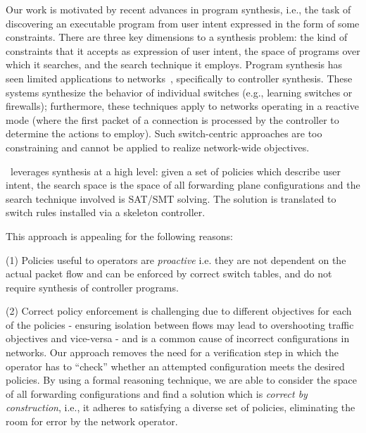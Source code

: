   Our work is motivated by recent advances in program synthesis, i.e.,
  the task of discovering an executable program from user intent
  expressed in the form of some constraints. There are three key
  dimensions to a synthesis problem: the kind of constraints that it accepts as
  expression of user intent, the space of programs over which it
  searches, and the search technique it employs. Program synthesis has
  seen limited applications to networks~\cite{netegg,decentralize},
  specifically to controller synthesis. These systems synthesize the
  behavior of individual switches (e.g., learning switches or
  firewalls); furthermore, these techniques apply to networks
  operating in a reactive mode (where the first packet of a connection
  is processed by the controller to determine the actions to
  employ). Such switch-centric approaches are too constraining and
  cannot be applied to realize network-wide objectives.

\Name\ leverages synthesis at a high level: given a set of
policies which describe user intent, the search space is the space of
all forwarding plane configurations and the search technique involved
is SAT/SMT solving. The solution is translated to switch rules installed via a skeleton controller.

This approach is appealing for the following reasons: 

(1)
Policies useful to operators are \emph{proactive} i.e. they are not
dependent on the actual packet flow and can be enforced by 
correct switch tables, and do not require synthesis of controller programs.

(2) Correct policy enforcement is challenging due to different
objectives for each of the policies - ensuring isolation between flows
may lead to overshooting traffic objectives and vice-versa - and is a common
cause of incorrect configurations in networks.  Our approach removes
the need for a verification step in which the operator has to
``check'' whether an attempted configuration meets the desired
policies.  By using a formal reasoning technique, we are able to
consider the space of all forwarding configurations and find a
solution which is \emph{correct by construction}, i.e., it adheres to
satisfying a diverse set of policies, eliminating the room for error
by the network operator.

